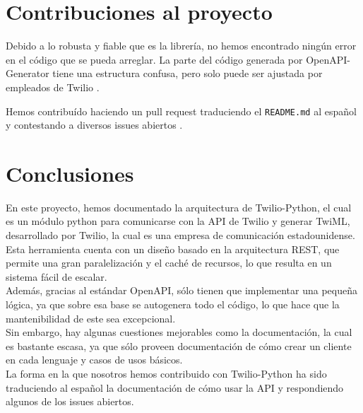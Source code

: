 \documentclass{article}
\begin{document}
\section{Contribuciones al proyecto}

Debido a lo robusta y fiable que es la librería,
no hemos encontrado ningún error en el código que se pueda arreglar.
La parte del código generada por OpenAPI-Generator
tiene una estructura confusa,
pero solo puede ser ajustada por empleados de Twilio \cite{contributing}.

Hemos contribuído haciendo un pull request
traduciendo el \verb|README.md| al español
\cite{contribución-readme}
y contestando a diversos issues abiertos
\cite{contribución-repeated-code}
\cite{contribución-security-improvements}
\cite{contribución-wrong-login}.

\section{Conclusiones}

En este proyecto, hemos documentado la arquitectura de Twilio-Python, el cual es un módulo python para comunicarse con la API de Twilio y generar TwiML, desarrollado por Twilio, la cual es una empresa de comunicación estadounidense.\\
Esta herramienta cuenta con un diseño basado en la arquitectura REST, que permite una gran paralelización y el caché de recursos, lo que resulta en un sistema fácil de escalar.\\
Además, gracias al estándar OpenAPI, sólo tienen que implementar una pequeña lógica, ya que sobre esa base se autogenera todo el código, lo que hace que la mantenibilidad de este sea excepcional.\\
Sin embargo, hay algunas cuestiones mejorables como la documentación, la cual es bastante escasa, ya que sólo proveen documentación de cómo crear un cliente en cada lenguaje y casos de usos básicos. \\
La forma en la que nosotros hemos contribuido con Twilio-Python ha sido traduciendo al español la documentación de cómo usar la API y respondiendo algunos de los issues abiertos.

\newpage

\printbibliography
\end{document}
